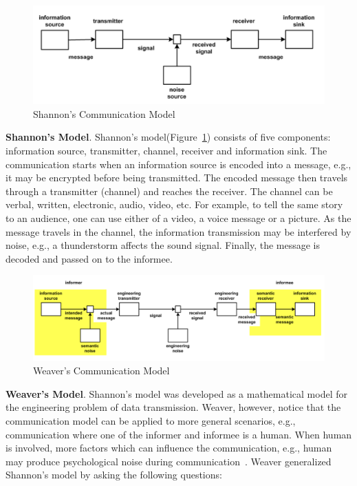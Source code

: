 \begin{figure}[h]
\centering
\includegraphics[width=.7\linewidth]{figure/chapter1/shannon}
\caption{Shannon's Communication Model~\cite{shannon1948mathematical}\label{fig:ch1:shannon}}
\end{figure}

\textbf{Shannon's Model}. Shannon's model(Figure~\ref{fig:ch1:shannon}) consists of five components: information source, transmitter, channel, receiver and information sink. The communication starts when an information source is encoded into a message, e.g., it may be encrypted before being transmitted. The encoded message then travels through a transmitter (channel) and reaches the receiver. The channel can be verbal, written, electronic, audio, video, etc. For example, to tell the same story to an audience, one can use either of a video, a voice message or a picture. As the message travels in the channel, the information transmission may be interfered by noise, e.g., a thunderstorm affects the sound signal. Finally, the message is decoded and passed on to the informee. 

\begin{figure}[h]
\centering
\includegraphics[width=.9\linewidth]{figure/chapter1/weaver}
\caption{Weaver's Communication Model~\cite{shannon1951mathematical}\label{fig:ch1:weaver}}
\end{figure}

\textbf{Weaver's Model}. Shannon's model was developed as a mathematical model for the engineering problem of data transmission. Weaver, however, notice that the communication model can be applied to more general scenarios, e.g., communication where one of the informer and informee is a human. When human is involved, more factors which can influence the communication, e.g., human may produce psychological noise during communication~\cite{miller1967psychology}. Weaver generalized Shannon's model by asking the following questions:

